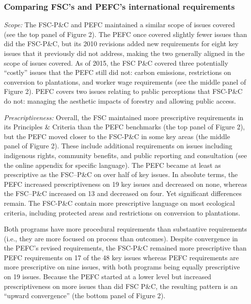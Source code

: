 \documentclass[
      12pt,
            Review ]{article}
\begin{document}
\subsubsection{Comparing FSC's and PEFC's international
requirements}\label{comparing-fscs-and-pefcs-international-requirements}

\emph{Scope:} The FSC-P\&C and PEFC maintained a similar scope of issues
covered (see the top panel of Figure 2). The PEFC once covered slightly
fewer issues than did the FSC-P\&C, but its 2010 revisions added new
requirements for eight key issues that it previously did not address,
making the two generally aligned in the scope of issues covered. As of
2015, the FSC P\&C covered three potentially ``costly'' issues that the
PEFC still did not: carbon emissions, restrictions on conversion to
plantations, and worker wage requirements (see the middle panel of
Figure 2). PEFC covers two issues relating to public perceptions that
FSC-P\&C do not: managing the aesthetic impacts of forestry and allowing
public access.

\emph{Prescriptiveness:} Overall, the FSC maintained more prescriptive
requirements in its Principles \& Criteria than the PEFC benchmarks (the
top panel of Figure 2), but the PEFC moved closer to the FSC-P\&C in
some key areas (the middle panel of Figure 2). These include additional
requirements on issues including indigenous rights, community benefits,
and public reporting and consultation (see the online appendix for
specific language). The PEFC became at least as prescriptive as the
FSC--P\&C on over half of key issues. In absolute terms, the PEFC
increased prescriptiveness on 19 key issues and decreased on none,
whereas the FSC--P\&C increased on 13 and decreased on four. Yet
significant differences remain. The FSC-P\&C contain more prescriptive
language on most ecological criteria, including protected areas and
restrictions on conversion to plantations.

Both programs have more procedural requirements than substantive
requirements (i.e., they are more focused on process than outcomes).
Despite convergence in the PEFC's revised requirements, the FSC-P\&C
remained more prescriptive than PEFC requirements on 17 of the 48 key
issues whereas PEFC requirements are more prescriptive on nine issues,
with both programs being equally prescriptive on 19 issues. Because the
PEFC started at a lower level but increased prescriptiveness on more
issues than did FSC P\&C, the resulting pattern is an ``upward
convergence'' (the bottom panel of Figure 2).
\end{document}
